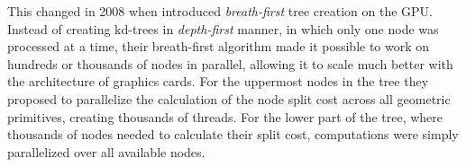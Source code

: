
This changed in 2008 when \zhou{} introduced \textit{breath-first} tree creation
on the GPU. Instead of creating kd-trees in \textit{depth-first} manner, in
which only one node was processed at a time, their breath-first algorithm made
it possible to work on hundreds or thousands of nodes in parallel, allowing it
to scale much better with the architecture of graphics cards. For the uppermost
nodes in the tree they proposed to parallelize the calculation of the node split
cost across all geometric primitives, creating thousands of threads. For the
lower part of the tree, where thousands of nodes needed to calculate their split
cost, computations were simply parallelized over all available nodes.




